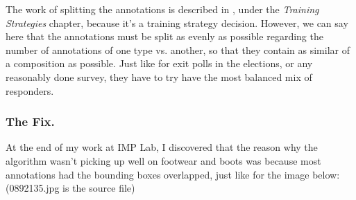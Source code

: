 The work of splitting the annotations is described in , under the \emph{Training Strategies} chapter, because it's a training strategy decision. However, we can say here that the annotations must be split as evenly as possible regarding the number of annotations of one type vs. another, so that they contain as similar of a composition as possible. Just like for exit polls in the elections, or any reasonably done survey, they have to try have the most balanced mix of responders.

\subsubsection{The Fix.}\label{s:ds-mn-fix}

At the end of my work at IMP Lab, I discovered that the reason why the algorithm wasn't picking up well on footwear and boots was because most annotations had the bounding boxes overlapped, just like for the image below: (0892135.jpg is the source file)

